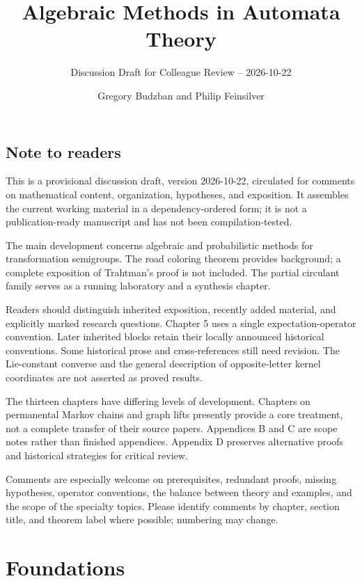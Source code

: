 \documentclass[graybox,envcountchap]{svmono}
\begin{document}
\author{Gregory Budzban and Philip Feinsilver}
\title{Algebraic Methods in Automata Theory}
\subtitle{Discussion Draft for Colleague Review -- 2026-10-22}
\maketitle
\frontmatter

\chapter*{Note to readers}
This is a provisional discussion draft, version 2026-10-22, circulated for
comments on mathematical content, organization, hypotheses, and exposition.
It assembles the current working material in a dependency-ordered form;
it is not a publication-ready manuscript and has not been compilation-tested.

The main development concerns algebraic and probabilistic methods for
transformation semigroups. The road coloring theorem provides background;
a complete exposition of Trahtman's proof is not included. The partial
circulant family serves as a running laboratory and a synthesis chapter.

Readers should distinguish inherited exposition, recently added material,
and explicitly marked research questions. Chapter 5 uses a single expectation-operator convention. Later inherited
blocks retain their locally announced historical conventions. Some historical prose and cross-references still need revision.
The Lie-constant converse and the general description of opposite-letter
kernel coordinates are not asserted as proved results.

The thirteen chapters have differing levels of development. Chapters on
permanental Markov chains and graph lifts presently provide a core treatment,
not a complete transfer of their source papers. Appendices B and C are
scope notes rather than finished appendices. Appendix D preserves alternative
proofs and historical strategies for critical review.

Comments are especially welcome on prerequisites, redundant proofs, missing
hypotheses, operator conventions, the balance between theory and examples,
and the scope of the specialty topics. Please identify comments by chapter,
section title, and theorem label where possible; numbering may change.

\tableofcontents

\mainmatter
\part{Foundations}



\end{document}
